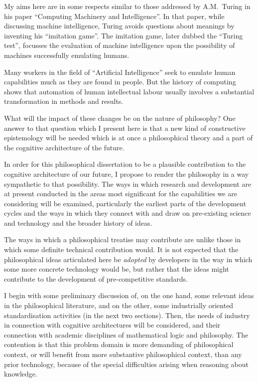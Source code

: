 My aims here are in some respects similar to those addressed by A.M.~Turing
in his paper ``Computing Machinery and Intelligence''.
In that paper, while discussing machine intelligence, Turing avoids questions
about meanings by inventing his ``imitation game''.
The imitation game, later dubbed the ``Turing test'', focusses the evaluation of
machine intelligence upon the possibility of machines successfully emulating humans.

Many workers in the field of ``Artificial Intelligence'' seek to emulate
human capabilities much as they are found in people.
But the history of computing shows that automation of human intellectual labour
usually involves a substantial transformation in methods and results.

What will the impact of these changes be on the nature of philosophy?
One answer to that question which I present here is that a new kind of
constructive epistemology will be needed which is at once a philosophical
theory and a part of the cognitive architecture of the future.

In order for this philosophical dissertation to be a plausible contribution
to the cognitive architecture of our future, I propose to render the philosophy
in a way sympathetic to that possibility.
The ways in which research and development are at present conducted in the
areas most significant for the capabilities we are considering will be examined,
particularly the earliest parts of the development cycles and the ways in which
they connect with and draw on pre-existing science and technology and the
broader history of ideas.

The ways in which a philosophical treatise may contribute are unlike those in
which some definite technical contribution would.
It is not expected that the philosophical ideas articulated here be \emph{adopted} by developers
in the way in which some more concrete technology would be, but rather that
the ideas might contribute to the development of pre-competitive standards.

I begin with some preliminary discussion of, on the one hand, some relevant
ideas in the philosophical literature, and on the other, some industrially
oriented standardisation activities (in the next two sections).
Then, the needs of industry in connection with cognitive architectures will
be considered, and their connection with academic disciplines of mathematical
logic and philosophy.
The contention is that this problem domain is more demanding of philosophical
context, or will benefit from more substantive philosophical context, than any
prior technology, because of the special difficulties arising when reasoning
about knowledge.

